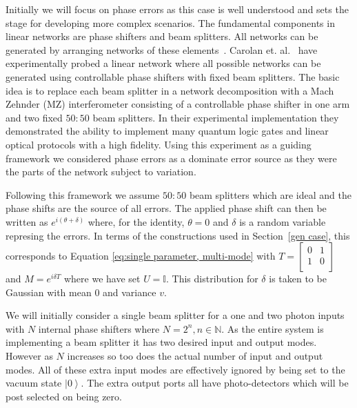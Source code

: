 \documentclass[aps,pra,twocolumn,superscriptaddress,numerical]{revtex4-1}
\begin{document}

Initially we will focus on phase errors as this case is well understood and sets the stage for developing more complex scenarios.  The fundamental components in linear networks are phase shifters and beam splitters.  All networks can be generated by arranging networks of these elements~\cite{reck}.  Carolan et. al.~\cite{ULO} have experimentally probed a linear network where all possible networks can be generated using controllable phase shifters with fixed beam splitters. The basic idea is to replace each beam splitter in a network decomposition with a Mach Zehnder (MZ) interferometer consisting of a controllable phase shifter in one arm and two fixed $50:50$ beam splitters. In their experimental implementation they demonstrated the ability to implement many quantum logic gates and linear optical protocols with a high fidelity.  Using this experiment as a guiding framework we considered phase errors as a dominate error source as they were the parts of the network subject to variation. 
	
Following this framework we assume $50:50$ beam splitters which are ideal and the phase shifts are the source of all errors. The applied phase shift can then be written as $e^{i(\theta+\delta)}$ where, for the identity, $\theta=0$ and $\delta$ is a random variable represing the errors.  In terms of the constructions used in Section~\ref{gen case}, this corresponds to Equation \ref{eq:single parameter, multi-mode} with $T=\begin{bmatrix}	0 & 1 \\	1 & 0 \\\end{bmatrix}$ and $M=e^{i\delta T}$ where we have set $U=\mathbb{I}$. This distribution for $\delta$ is taken to be Gaussian with mean $0$ and variance $v$. 

We will initially consider a single beam splitter for a one and two photon inputs with $N$ internal phase shifters where $N=2^{n},n\in\mathbb{N}$. As the entire system is implementing a beam splitter it has two desired input and output modes. However as $N$ increases so too does the actual number of input and output modes. All of these extra input modes are effectively ignored by being set to the vacuum state $\left|0\right\rangle $. The extra output ports all have photo-detectors which will be post selected on being zero.
		
\end{document}

